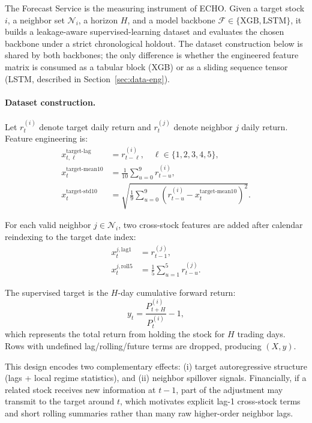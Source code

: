 \documentclass[12pt,a4paper,titlepage]{article}
\begin{document}
The Forecast Service is the measuring instrument of ECHO. Given a target stock \(i\), a neighbor set \(\mathcal{N}_i\), a horizon \(H\), and a model backbone \(\mathcal{F}\in\{\text{XGB},\text{LSTM}\}\), it builds a leakage-aware supervised-learning dataset and evaluates the chosen backbone under a strict chronological holdout. The dataset construction below is shared by both backbones; the only difference is whether the engineered feature matrix is consumed as a tabular block (XGB) or as a sliding sequence tensor (LSTM, described in Section~\ref{sec:data-eng}).

\paragraph{Dataset construction.}
Let \(r_t^{(i)}\) denote target daily return and \(r_t^{(j)}\) denote neighbor \(j\) daily return. Feature engineering is:
\begin{align*}
x_{t,\ell}^{\text{target-lag}} &= r_{t-\ell}^{(i)}, \quad \ell \in \{1,2,3,4,5\}, \\
x_t^{\text{target-mean10}} &= \frac{1}{10}\sum_{u=0}^{9} r_{t-u}^{(i)}, \\
x_t^{\text{target-std10}} &= \sqrt{\frac{1}{9}\sum_{u=0}^{9}\left(r_{t-u}^{(i)}-x_t^{\text{target-mean10}}\right)^2}.
\end{align*}

For each valid neighbor \(j \in \mathcal{N}_i\), two cross-stock features are added after calendar reindexing to the target date index:
\begin{align*}
x_t^{j,\text{lag1}} &= r_{t-1}^{(j)}, \\
x_t^{j,\text{roll5}} &= \frac{1}{5}\sum_{u=1}^{5} r_{t-u}^{(j)}.
\end{align*}

The supervised target is the \(H\)-day cumulative forward return:
\[
y_t = \frac{P_{t+H}^{(i)}}{P_t^{(i)}} - 1,
\]
which represents the total return from holding the stock for \(H\) trading days.
Rows with undefined lag/rolling/future terms are dropped, producing \((X, y)\).

This design encodes two complementary effects: (i) target autoregressive structure (lags + local regime statistics), and (ii) neighbor spillover signals. Financially, if a related stock receives new information at \(t-1\), part of the adjustment may transmit to the target around \(t\), which motivates explicit lag-1 cross-stock terms and short rolling summaries rather than many raw higher-order neighbor lags.
\end{document}

